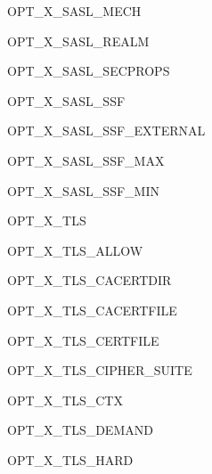 \begin{datadesc}{OPT_X_SASL_MECH}
\end{datadesc}

\begin{datadesc}{OPT_X_SASL_REALM}
\end{datadesc}

\begin{datadesc}{OPT_X_SASL_SECPROPS}
\end{datadesc}

\begin{datadesc}{OPT_X_SASL_SSF}
\end{datadesc}

\begin{datadesc}{OPT_X_SASL_SSF_EXTERNAL}
\end{datadesc}

\begin{datadesc}{OPT_X_SASL_SSF_MAX}
\end{datadesc}

\begin{datadesc}{OPT_X_SASL_SSF_MIN}
\end{datadesc}

\begin{datadesc}{OPT_X_TLS}
\end{datadesc}

\begin{datadesc}{OPT_X_TLS_ALLOW}
\end{datadesc}

\begin{datadesc}{OPT_X_TLS_CACERTDIR}
\end{datadesc}

\begin{datadesc}{OPT_X_TLS_CACERTFILE}
\end{datadesc}

\begin{datadesc}{OPT_X_TLS_CERTFILE}
\end{datadesc}

\begin{datadesc}{OPT_X_TLS_CIPHER_SUITE}
\end{datadesc}

\begin{datadesc}{OPT_X_TLS_CTX}
\end{datadesc}

\begin{datadesc}{OPT_X_TLS_DEMAND}
\end{datadesc}

\begin{datadesc}{OPT_X_TLS_HARD}
\end{datadesc}

